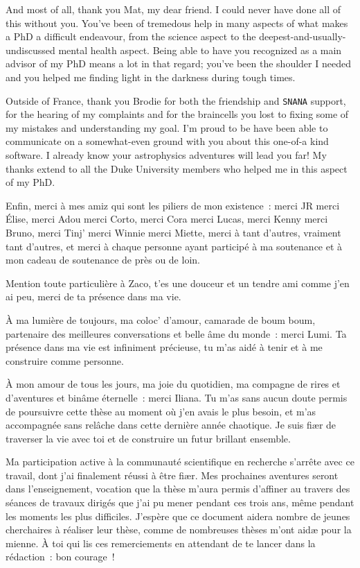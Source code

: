 \documentclass[../main/main.tex]{subfiles}
\begin{document}
And most of all, thank you Mat, my dear friend. I could never have done all of
this without you. You've been of tremedous help in many aspects of what makes a
PhD a difficult endeavour, from the science aspect to the
deepest-and-usually-undiscussed mental health aspect. Being able to have you
recognized as a main advisor of my PhD means a lot in that regard\string; you've
been the shoulder I needed and you helped me finding light in the darkness
during tough times.

Outside of France, thank you Brodie for both the friendship and \texttt{SNANA}
support, for the hearing of my complaints and for the braincells you lost to
fixing some of my mistakes and understanding my goal. I'm proud to be have been
able to communicate on a somewhat-even ground with you about this one-of-a kind
software. I already know your astrophysics adventures will lead you far\string!
My thanks extend to all the Duke University members who helped me in this aspect
of my PhD.

Enfin, merci à mes amiz qui sont les piliers de mon existence~: merci JR merci
Élise, merci Adou merci Corto, merci Cora merci Lucas, merci Kenny merci Bruno,
merci Tinj' merci Winnie merci Miette, merci à tant d'autres, vraiment tant
d'autres, et merci à chaque personne ayant participé à ma soutenance et à mon
cadeau de soutenance de près ou de loin.

Mention toute particulière à Zaco, t'es une douceur et un tendre ami comme j'en
ai peu, merci de ta présence dans ma vie.

\vfill

À ma lumière de toujours, ma coloc' d'amour, camarade de boum boum, partenaire
des meilleures conversations et belle âme du monde~: merci Lumi. Ta présence
dans ma vie est infiniment précieuse, tu m'as aidé à tenir et à me construire
comme personne.

\vfill

À mon amour de tous les jours, ma joie du quotidien, ma compagne de rires et
d'aventures et binâme éternelle~: merci Iliana. Tu m'as sans aucun doute permis
de poursuivre cette thèse au moment où j'en avais le plus besoin, et m'as
accompagnée sans relâche dans cette dernière année chaotique. Je suis fiær de
traverser la vie avec toi et de construire un futur brillant ensemble.

\vfill

Ma participation active à la communauté scientifique en recherche s'arrête avec
ce travail, dont j'ai finalement réussi à être fiær. Mes prochaines aventures
seront dans l'enseignement, vocation que la thèse m'aura permis d'affiner au
travers des séances de travaux dirigés que j'ai pu mener pendant ces trois ans,
même pendant les moments les plus difficiles. J'espère que ce document aidera
nombre de jeunes cherchaires à réaliser leur thèse, comme de nombreuses thèses
m'ont aidæ pour la mienne. À toi qui lis ces remerciements en attendant de te
lancer dans la rédaction~: bon courage~!
\end{document}
